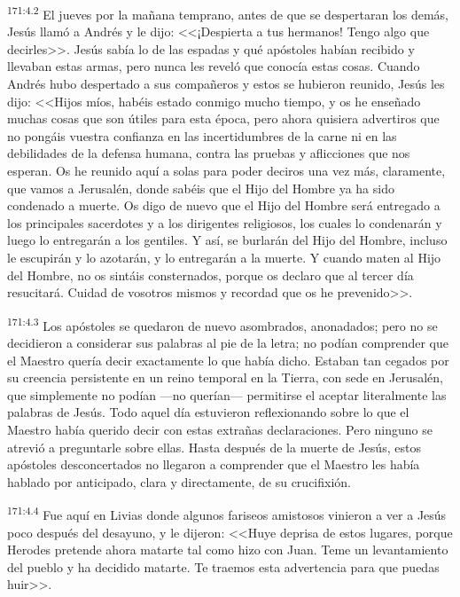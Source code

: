 \par 
\textsuperscript{171:4.2} El jueves por la mañana temprano, antes de que se despertaran los demás, Jesús llamó a Andrés y le dijo: <<¡Despierta a tus hermanos! Tengo algo que decirles>>. Jesús sabía lo de las espadas y qué apóstoles habían recibido y llevaban estas armas, pero nunca les reveló que conocía estas cosas. Cuando Andrés hubo despertado a sus compañeros y estos se hubieron reunido, Jesús les dijo: <<Hijos míos, habéis estado conmigo mucho tiempo, y os he enseñado muchas cosas que son útiles para esta época, pero ahora quisiera advertiros que no pongáis vuestra confianza en las incertidumbres de la carne ni en las debilidades de la defensa humana, contra las pruebas y aflicciones que nos esperan. Os he reunido aquí a solas para poder deciros una vez más, claramente, que vamos a Jerusalén, donde sabéis que el Hijo del Hombre ya ha sido condenado a muerte. Os digo de nuevo que el Hijo del Hombre será entregado a los principales sacerdotes y a los dirigentes religiosos, los cuales lo condenarán y luego lo entregarán a los gentiles. Y así, se burlarán del Hijo del Hombre, incluso le escupirán y lo azotarán, y lo entregarán a la muerte. Y cuando maten al Hijo del Hombre, no os sintáis consternados, porque os declaro que al tercer día resucitará. Cuidad de vosotros mismos y recordad que os he prevenido>>.

\par 
\textsuperscript{171:4.3} Los apóstoles se quedaron de nuevo asombrados, anonadados; pero no se decidieron a considerar sus palabras al pie de la letra; no podían comprender que el Maestro quería decir exactamente lo que había dicho. Estaban tan cegados por su creencia persistente en un reino temporal en la Tierra, con sede en Jerusalén, que simplemente no podían ---no querían--- permitirse el aceptar literalmente las palabras de Jesús. Todo aquel día estuvieron reflexionando sobre lo que el Maestro había querido decir con estas extrañas declaraciones. Pero ninguno se atrevió a preguntarle sobre ellas. Hasta después de la muerte de Jesús, estos apóstoles desconcertados no llegaron a comprender que el Maestro les había hablado por anticipado, clara y directamente, de su crucifixión.

\par 
\textsuperscript{171:4.4} Fue aquí en Livias donde algunos fariseos amistosos vinieron a ver a Jesús poco después del desayuno, y le dijeron: <<Huye deprisa de estos lugares, porque Herodes pretende ahora matarte tal como hizo con Juan. Teme un levantamiento del pueblo y ha decidido matarte. Te traemos esta advertencia para que puedas huir>>.

